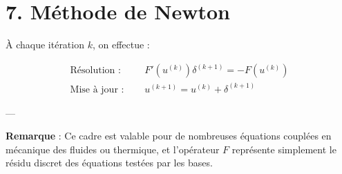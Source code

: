 \documentclass[11pt]{article}
\begin{document}
\section*{7. Méthode de Newton}

À chaque itération \( k \), on effectue :

\begin{align*}
\text{Résolution : } & \quad F'(u^{(k)}) \delta^{(k+1)} = -F(u^{(k)}) \\
\text{Mise à jour : } & \quad u^{(k+1)} = u^{(k)} + \delta^{(k+1)}
\end{align*}

---

\textbf{Remarque} : Ce cadre est valable pour de nombreuses équations couplées en mécanique des fluides ou thermique, et l’opérateur \( F \) représente simplement le résidu discret des équations testées par les bases.
\end{document}

